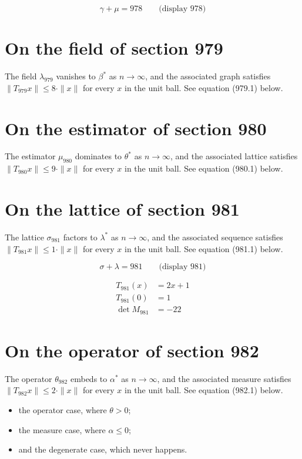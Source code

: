 \documentclass{article}
\begin{document}
$$
\gamma + \mu = 978 \qquad \text{(display 978)}
$$

\section{On the field of section 979}
The field $\lambda_{979}$ vanishes to $\beta^{*}$ as $n \to \infty$,
and the associated graph satisfies $\|T_{979} x\| \leq 8 \cdot \|x\|$
for every $x$ in the unit ball. See equation (979.1) below.

\section{On the estimator of section 980}
The estimator $\mu_{980}$ dominates to $\theta^{*}$ as $n \to \infty$,
and the associated lattice satisfies $\|T_{980} x\| \leq 9 \cdot \|x\|$
for every $x$ in the unit ball. See equation (980.1) below.

\section{On the lattice of section 981}
The lattice $\sigma_{981}$ factors to $\lambda^{*}$ as $n \to \infty$,
and the associated sequence satisfies $\|T_{981} x\| \leq 1 \cdot \|x\|$
for every $x$ in the unit ball. See equation (981.1) below.

$$
\sigma + \lambda = 981 \qquad \text{(display 981)}
$$

\begin{align}
T_{981}(x) &= 2 x + 1 \\
T_{981}(0) &= 1 \\
\det M_{981} &= -22
\end{align}

\section{On the operator of section 982}
The operator $\theta_{982}$ embeds to $\alpha^{*}$ as $n \to \infty$,
and the associated measure satisfies $\|T_{982} x\| \leq 2 \cdot \|x\|$
for every $x$ in the unit ball. See equation (982.1) below.

\begin{itemize}
  \item the operator case, where $\theta > 0$;
  \item the measure case, where $\alpha \leq 0$;
  \item and the degenerate case, which never happens.
\end{itemize}
\end{document}
